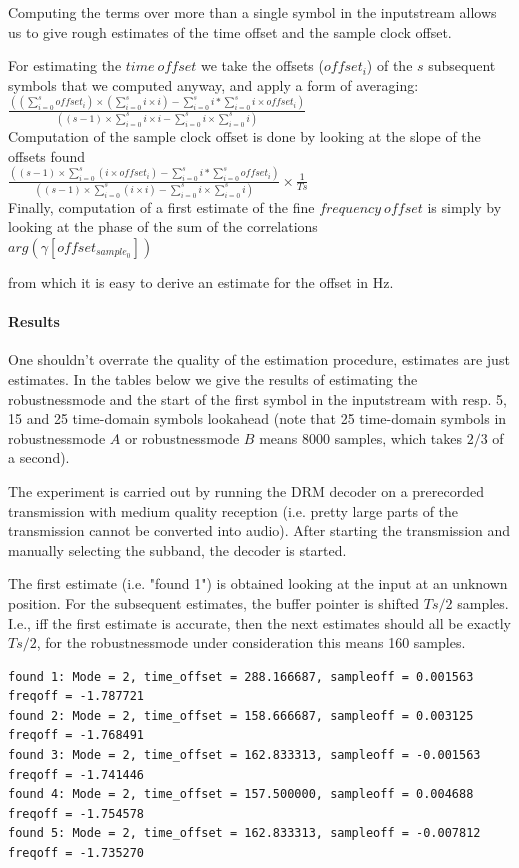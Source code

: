 \documentclass[11pt]{article}
\begin{document}
Computing the terms over more than a single symbol in the inputstream
allows us to  give rough estimates of the time offset
and the sample clock offset.

For estimating the $time\ offset$ we take the offsets ($offset_i$)
of the $s$ subsequent symbols that we computed anyway, and apply
a form of averaging\cite{Tsai}:
\ \\
{
$\frac{((\sum_{i=0}^s offset_i) \times (\sum_{i=0}^s i \times i) - \sum_{i=0}^s i * \sum_{i=0}^s i \times offset_i)}{((s - 1) \times \sum_{i=0}^s i \times i - \sum_{i=0}^s i \times \sum_{i=0}^s i)} $
}
\ \\

Computation of the sample clock offset is done by looking at the slope
of the offsets found\cite{Tsai}
\ \\
{
$\frac{((s - 1) \times \sum_{i=0}^s (i \times offset_i) - \sum_{i=0}^s i * \sum_{i=0}^s offset_i)}{((s - 1) \times \sum_{i=0}^s (i \times i) - \sum_{i=0}^s i \times \sum_{i=0}^s i)} \times \frac{1}{Ts}$
}
\ \\

Finally, computation of a first estimate of the fine $frequency\ offset$
is simply by looking
at the phase of the sum of the correlations
{
\ \\
$arg (\gamma [offset_{sample_0}])$
\ \\
}

from which it is easy to derive an estimate for the offset in Hz.
\paragraph{Results}
One shouldn't overrate the quality of the estimation procedure,
estimates are just estimates.
In the tables below we give the results of estimating the robustnessmode
and the start of the first symbol in the inputstream with resp.
5, 15 and 25  time-domain symbols
lookahead (note that 25 time-domain symbols in robustnessmode $A$
or robustnessmode $B$ means 8000 samples, which takes $2/3$ of a second).

The experiment is carried out by running the DRM decoder on a
prerecorded transmission with medium quality reception (i.e. pretty large parts
of the transmission cannot be converted into audio).
After starting the transmission and manually selecting the
subband, the decoder is started.

The first estimate (i.e. "found 1") is obtained looking at the input
at an unknown position. For the subsequent estimates, the buffer pointer
is shifted $Ts / 2$ samples. I.e., iff the first estimate
is accurate, then the next estimates should all be exactly $Ts / 2$,
for the robustnessmode under consideration this means 160 samples.
{\small
\begin{verbatim}
found 1: Mode = 2, time_offset = 288.166687, sampleoff = 0.001563 freqoff = -1.787721
found 2: Mode = 2, time_offset = 158.666687, sampleoff = 0.003125 freqoff = -1.768491
found 3: Mode = 2, time_offset = 162.833313, sampleoff = -0.001563 freqoff = -1.741446
found 4: Mode = 2, time_offset = 157.500000, sampleoff = 0.004688 freqoff = -1.754578
found 5: Mode = 2, time_offset = 162.833313, sampleoff = -0.007812 freqoff = -1.735270
\end{verbatim}
}
\end{document}
